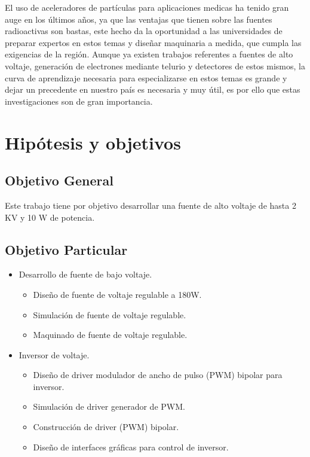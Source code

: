 El uso de aceleradores de partículas para aplicaciones medicas ha tenido gran auge en los últimos años, ya que las ventajas que tienen sobre las fuentes radioactivas son bastas, este hecho da la oportunidad a las universidades de preparar expertos en estos temas y diseñar maquinaria a medida, que cumpla las exigencias de la región. Aunque ya existen trabajos referentes a fuentes de alto voltaje, generación de electrones mediante telurio y detectores de estos mismos, la curva de aprendizaje necesaria para especializarse en estos temas es grande y dejar un precedente en nuestro país es necesaria y muy útil, es por ello que estas
investigaciones son de gran importancia.
\newpage
\section{Hipótesis y objetivos}

\subsection{Objetivo General}

Este trabajo tiene por objetivo desarrollar una fuente de alto voltaje de hasta 2 KV y 10 W de potencia.

\subsection{Objetivo Particular}


\begin{itemize}
\item Desarrollo de fuente de bajo voltaje.
\begin{itemize}
\item Diseño de fuente de voltaje regulable a 180W.
\item Simulación de fuente de voltaje regulable.
\item Maquinado de fuente de voltaje regulable.
\end{itemize}
\end{itemize}


\begin{itemize}
\item Inversor de voltaje.
\begin{itemize}  
\item Diseño de driver modulador de ancho de pulso (PWM) bipolar para inversor.
\item Simulación de driver generador de PWM.
\item Construcción de driver (PWM) bipolar.
\item Diseño de interfaces gráficas para control de inversor.
\end{itemize} 
\end{itemize}  

